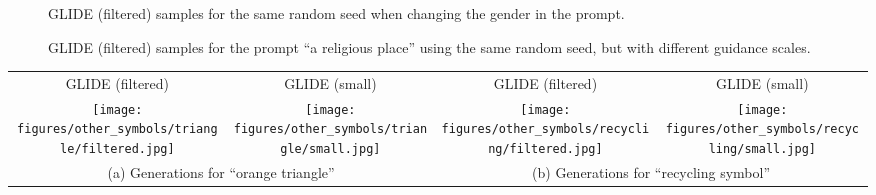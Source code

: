 \documentclass{article}
\newcommand{\modelname}{GLIDE}
\begin{document}
\begin{figure}[t]
    \centering
    \caption{\modelname{} (filtered) samples for the same random seed when changing the gender in the prompt.}
    \label{fig:toy_genders}
    \vskip -0.2in
\end{figure}


\begin{figure}[t]
    \centering
    \caption{\modelname{} (filtered) samples for the prompt ``a religious place'' using the same random seed, but with different guidance scales.}
    \label{fig:religion_guidance}
    \vskip -0.2in
\end{figure}

\begin{figure*}[t]
    \centering
\begin{tabular}{cccc}
        \small{GLIDE (filtered)} & \small{GLIDE (small)} & \small{GLIDE (filtered)} & \small{GLIDE (small)} \\
        \texttt{[image: figures/other\_symbols/triangle/filtered.jpg]} & \texttt{[image: figures/other\_symbols/triangle/small.jpg]} & \texttt{[image: figures/other\_symbols/recycling/filtered.jpg]} & \texttt{[image: figures/other\_symbols/recycling/small.jpg]} \\
        \multicolumn{2}{c}{\small{(a) Generations for ``orange triangle''}} & \multicolumn{2}{c}{\small{(b) Generations for ``recycling symbol''}}
    \end{tabular}
    \caption{Comparison of \modelname{} (filtered) and \modelname{} (small) samples for the prompt ``orange triangle'' (left) and ``recycling symbol'' (right). Even though these symbols were not filtered from the model, the filtered model generates less faithful renditions, likely due to the smaller dataset available.}
    \label{fig:symbol_knowledge}
    \vskip -0.2in
\end{figure*}
\end{document}
